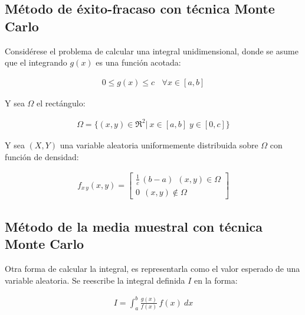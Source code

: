 \subsection{M\'etodo de \'exito-fracaso con t\'ecnica Monte Carlo}
\label{CapVII_5}

Consid\'erese el problema de calcular una integral unidimensional, donde se asume que el integrando $g(x)$ es una funci\'on acotada:

\begin{eqnarray}
 	0 \le g(x) \le c \, \; \, \; \forall x \in [a, b] \nonumber
 \label{EqZZZ12} 
\end{eqnarray}


Y sea $\Omega$ el rect\'angulo:

\begin{eqnarray}
 	\Omega = \{ (x, y) \in \Re ^{2} | \: x \in [a, b] \; y \in [0, c] \} \nonumber
 \label{EqZZZ13} 
\end{eqnarray}


Y sea $(X, Y)$ una variable aleatoria uniformemente distribuida sobre $\Omega$ con funci\'on de densidad:

\begin{eqnarray}
 	f_{x \, y} (x, y) =   \left[ \begin{array}{c}
                            \frac{1}{c} \, (b -a) \: \: (x, y) \in \Omega  \\ 
 	                    0 \: \: (x, y) \notin \Omega  \nonumber
                            \end{array} \right]
 \label{EqZZZ14} 
\end{eqnarray}


\subsection{M\'etodo de la media muestral con t\'ecnica Monte Carlo}
\label{CapVII_6}

Otra forma de calcular la integral, es representarla como el valor esperado de una variable aleatoria. 
%
Se reescribe la integral definida $I$ en la forma:

\begin{eqnarray}
 	I = \int _{a} ^{b} \frac{g(x)}{f(x)} \, f(x) \: dx
 \label{EqZZZ15} 
\end{eqnarray}

